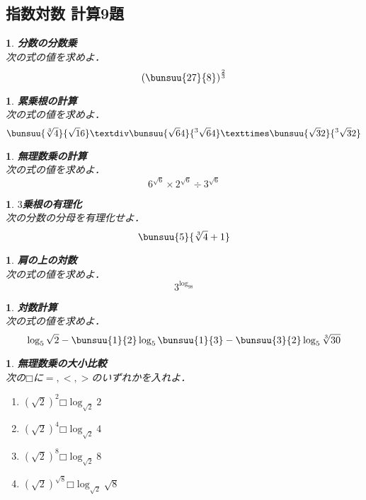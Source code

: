 \documentclass[10pt,
fleqn,
dvipdfmx,
uplatex
]{jsarticle}
\newtheorem{question}[Question]{}
\begin{document}
\subsection{指数対数 計算9題}



\begin{question}{\bf\boldmath 分数の分数乗}\\
次の式の値を求めよ．
\[\left(\bunsuu{{{27}}}{8}\right)^{\frac{2}{3}}\]
\end{question}



\begin{question}{\bf\boldmath 累乗根の計算}\\
次の式の値を求めよ．
\[\bunsuu{{\sqrt[3]4}}{{{\sqrt 16}}}÷\bunsuu{{{\sqrt 64}}}{{^3{\sqrt 64}}}×\bunsuu{{{\sqrt 32}}}{{^3{\sqrt 32}}}\]
\end{question}



\begin{question}{\bf\boldmath 無理数乗の計算}\\
次の式の値を求めよ．
\[6^{\sqrt 6}×2^{\sqrt 6}÷3^{\sqrt 6}\]
\end{question}



\begin{question}{\bf\boldmath $3$乗根の有理化}\\
次の分数の分母を有理化せよ．
\[\bunsuu{5}{{}\sqrt[3]4+1}\]
\end{question}



\begin{question}{\bf\boldmath 肩の上の対数}\\
次の式の値を求めよ．
\[3^{\log _98}\]
\end{question}



\begin{question}{\bf\boldmath 対数計算}\\
次の式の値を求めよ．
\[\log _5\sqrt 2-\bunsuu{1}{2}\log _5\bunsuu{1}{3}-\bunsuu{3}{2}\log _5\sqrt[3]{{30}}\]
\end{question}



\begin{question}{\bf\boldmath 無理数乗の大小比較}\\
次の$□$に$=, <, >$のいずれかを入れよ．
\begin{enumerate}
\item $\left(\sqrt 2\right)^2□\log _{\sqrt 2}2$
\item $\left(\sqrt 2\right)^4□\log _{\sqrt 2}4$
\item $\left(\sqrt 2\right)^8□\log _{\sqrt 2}8$
\item $\left(\sqrt 2\right)^{\sqrt 8}□\log _{\sqrt 2}\sqrt 8$
\end{enumerate}

\end{question}
\end{document}
